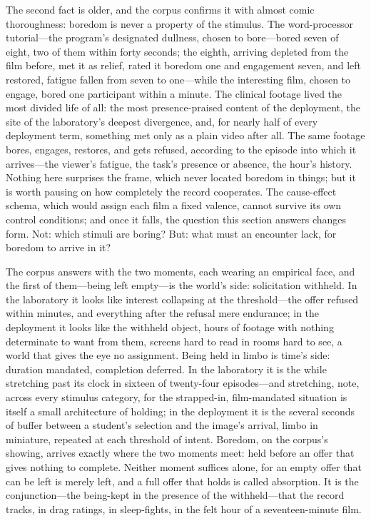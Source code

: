 The second fact is older, and the corpus confirms it with almost comic thoroughness: boredom is never a property of the stimulus. The word-processor tutorial---the program's designated dullness, chosen to bore---bored seven of eight, two of them within forty seconds; the eighth, arriving depleted from the film before, met it as relief, rated it boredom one and engagement seven, and left restored, fatigue fallen from seven to one---while the interesting film, chosen to engage, bored one participant within a minute. The clinical footage lived the most divided life of all: the most presence-praised content of the deployment, the site of the laboratory's deepest divergence, and, for nearly half of every deployment term, something met only as a plain video after all. The same footage bores, engages, restores, and gets refused, according to the episode into which it arrives---the viewer's fatigue, the task's presence or absence, the hour's history. Nothing here surprises the frame, which never located boredom in things; but it is worth pausing on how completely the record cooperates. The cause-effect schema, which would assign each film a fixed valence, cannot survive its own control conditions; and once it falls, the question this section answers changes form. Not: which stimuli are boring? But: what must an encounter lack, for boredom to arrive in it?

The corpus answers with the two moments, each wearing an empirical face, and the first of them---being left empty---is the world's side: solicitation withheld. In the laboratory it looks like interest collapsing at the threshold---the offer refused within minutes, and everything after the refusal mere endurance; in the deployment it looks like the withheld object, hours of footage with nothing determinate to want from them, screens hard to read in rooms hard to see, a world that gives the eye no assignment. Being held in limbo is time's side: duration mandated, completion deferred. In the laboratory it is the while stretching past its clock in sixteen of twenty-four episodes---and stretching, note, across every stimulus category, for the strapped-in, film-mandated situation is itself a small architecture of holding; in the deployment it is the several seconds of buffer between a student's selection and the image's arrival, limbo in miniature, repeated at each threshold of intent. Boredom, on the corpus's showing, arrives exactly where the two moments meet: held before an offer that gives nothing to complete. Neither moment suffices alone, for an empty offer that can be left is merely left, and a full offer that holds is called absorption. It is the conjunction---the being-kept in the presence of the withheld---that the record tracks, in drag ratings, in sleep-fights, in the felt hour of a seventeen-minute film.

